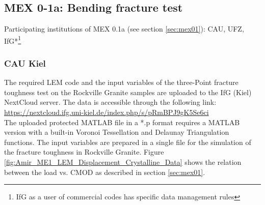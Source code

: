 \subsection{MEX 0-1a: Bending fracture test}

Participating institutions of MEX 0.1a (see section \ref{sec:mex01}): CAU, UFZ, IfG*\footnote{IfG as a user of commercial codes has specific data management rules}

\subsubsection*{CAU Kiel}

The required LEM code and the input variables of the three-Point fracture toughness test on the Rockville Granite samples are uploaded to the IfG (Kiel) NextCloud server. The data is accessible through the following link:\\
\hyperlink{https://nextcloud.ifg.uni-kiel.de/index.php/s/pRmBPJ9gK5Se6ci}{https://nextcloud.ifg.uni-kiel.de/index.php/s/pRmBPJ9gK5Se6ci}\\

The uploaded protected MATLAB file in a *.p format requires a MATLAB version with a built-in Voronoi Tessellation and Delaunay Triangulation functions. The input variables are prepared in a single file for the simulation of the fracture toughness in Rockville Granite. Figure \ref{fig:Amir_ME1_LEM_Displacement_Crystalline_Data} shows the relation between the load vs. CMOD as described in section \ref {sec:mex01}.

